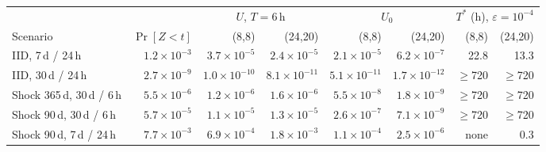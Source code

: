 \begin{tabular}{@{}lrrrrrrr@{}}
\toprule
 & & \multicolumn{2}{c}{$U$, $T=6$\,h} & \multicolumn{2}{c}{$U_0$} & \multicolumn{2}{c}{$T^{*}$ (h), $\varepsilon=10^{-4}$}\\
\cmidrule(lr){3-4}\cmidrule(lr){5-6}\cmidrule(l){7-8}
Scenario & $\Pr[Z<t]$ & (8,8) & (24,20) & (8,8) & (24,20) & (8,8) & (24,20)\\
\midrule
IID, 7\,d / 24\,h & $1.2{\times}10^{-3}$ & $3.7{\times}10^{-5}$ & $2.4{\times}10^{-5}$ & $2.1{\times}10^{-5}$ & $6.2{\times}10^{-7}$ & 22.8 & 13.3\\
IID, 30\,d / 24\,h & $2.7{\times}10^{-9}$ & $1.0{\times}10^{-10}$ & $8.1{\times}10^{-11}$ & $5.1{\times}10^{-11}$ & $1.7{\times}10^{-12}$ & $\ge$720 & $\ge$720\\
Shock 365\,d, 30\,d / 6\,h & $5.5{\times}10^{-6}$ & $1.2{\times}10^{-6}$ & $1.6{\times}10^{-6}$ & $5.5{\times}10^{-8}$ & $1.8{\times}10^{-9}$ & $\ge$720 & $\ge$720\\
Shock 90\,d, 30\,d / 6\,h & $5.7{\times}10^{-5}$ & $1.1{\times}10^{-5}$ & $1.3{\times}10^{-5}$ & $2.6{\times}10^{-7}$ & $7.1{\times}10^{-9}$ & $\ge$720 & $\ge$720\\
Shock 90\,d, 7\,d / 24\,h & $7.7{\times}10^{-3}$ & $6.9{\times}10^{-4}$ & $1.8{\times}10^{-3}$ & $1.1{\times}10^{-4}$ & $2.5{\times}10^{-6}$ & none & 0.3\\
\bottomrule
\end{tabular}
